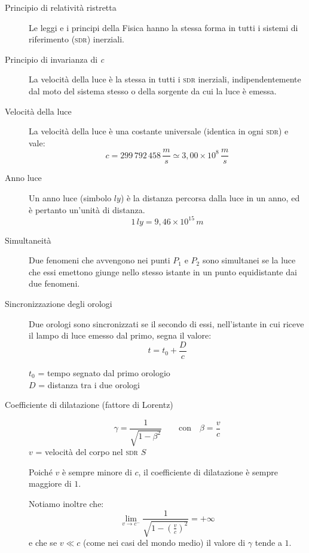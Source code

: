 \documentclass[a4paper,11pt,italian]{article}
\begin{document}
\begin{description}
  \item[Principio di relatività ristretta]
  Le leggi e i principi della Fisica hanno la stessa forma in tutti i sistemi di riferimento (\textsc{sdr}) inerziali.
  
  \item[Principio di invarianza di \textit{c}]
  La velocità della luce è la stessa in tutti i \textsc{sdr} inerziali, indipendentemente dal moto del sistema stesso o della sorgente da cui la luce è emessa.

  \item[Velocità della luce] La velocità della luce è una costante universale (identica in ogni \textsc{sdr}) e vale:
  \[ c = 299\,  792\, 458\,	\frac{m}{s} \simeq 3,00 \times 10^8 \,	\frac{m}{s} \]

  \item[Anno luce] Un anno luce (simbolo $ ly $) è la distanza percorsa dalla luce in un anno, ed è pertanto un'unità di distanza.
  \[ 1 \, ly = 9,46 \times 10^{15} \, m \]
  
  \item[Simultaneità]
  Due fenomeni che avvengono nei punti $ P_1 $ e $ P_2 $ sono simultanei se la luce che essi emettono giunge nello stesso istante in un punto equidistante dai due fenomeni.

  \item[Sincronizzazione degli orologi]
  Due orologi sono sincronizzati se il secondo di essi, nell'istante in cui riceve il lampo di luce emesso dal primo, segna il valore:
  \[ t = t_0 + \frac{D}{c} \]
  \begin{multicols}{2}
  $ t_0 $ = tempo segnato dal primo orologio\\
  $ D $ = distanza tra i due orologi
  \end{multicols}
  
  \item[Coefficiente di dilatazione (fattore di Lorentz)]
  \[ \gamma = \frac{1}{\sqrt{1-\beta^2}} \qquad \mathrm{con} \quad \beta = \frac{v}{c} \]
  $ v $ = velocità del corpo nel \textsc{sdr} $ S $
  
  Poiché $ v $ è sempre minore di $ c $, il coefficiente di dilatazione è sempre maggiore di $ 1 $.

  Notiamo inoltre che:
  \[ \lim_{v \rightarrow c^{-}} \frac{1}{\sqrt{1-(\frac{v}{c})^2}} = + \infty \]
  e che se $ v \ll c $ (come nei casi del mondo medio) il valore di $ \gamma $ tende a $ 1 $.
  

\end{description}
\end{document}
